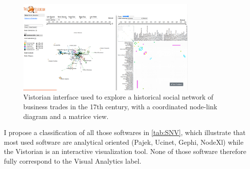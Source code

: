 \begin{figure}
    \centering %
    \includegraphics[width=0.8\textwidth,trim={0 1cm 0 0},clip]{static/figures/RelatedWork/vistorian}
    \caption{Vistorian interface\cite{serranomolineroUnderstandingUseVistorian2017} used to explore a historical social network of business trades in the 17th century, with a coordinated node-link diagram and a matrice view.}
    \label{fig:vistorian}
\end{figure}

I propose a classification of all those softwares in \ref{tab:SNV}, which illustrate that most used software are analytical oriented (Pajek, Ucinet, Gephi, NodeXl) while the Vistorian is an interactive visualization tool.
None of those software therefore fully correspond to the Visual Analytics label\cite{keimVisualAnalytics}.

